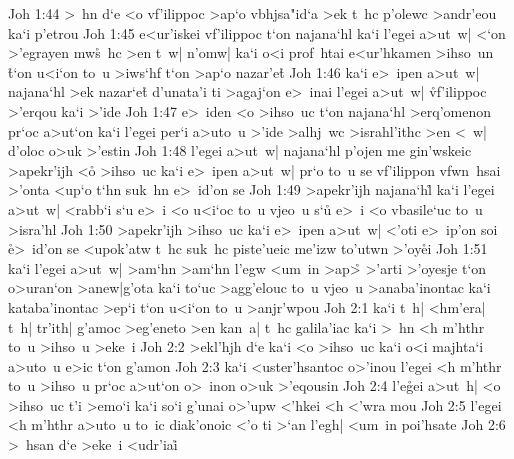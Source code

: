 \vs Joh 1:44
>~hn
d`e
<o
vf'ilippoc
>ap`o
vbhjsa"id`a
>ek
t~hc
p'olewc
>andr'eou
ka`i
p'etrou\bibvsend
\vs Joh 1:45
e<ur'iskei
vf'ilippoc
t`on
najana`hl
ka`i
l'egei
a>ut~w|
<`on
>'egrayen
mw\r{s}~hc
>en
t~w|
n'omw|
ka`i
o<i
prof~htai
e<ur'hkamen
>ihso~un
\r{t}`on
u<i`on
to~u
>iws`hf
t`on
>ap`o
nazar'e\r{t}\bibvsend
{}
\vs Joh 1:46
ka`i
e>~ipen
a>ut~w|
najana`hl
>ek
nazar`e\r{t}
d'unata'i
ti
>agaj`on
e>~inai
l'egei
a>ut~w|
\r{vf}'ilippoc
>'erqou
ka`i
>'ide\bibvsend
\vs Joh 1:47
e>~iden
<o
>ihso~uc
t`on
najana`hl
>erq'omenon
pr`oc
a>ut`on
ka`i
l'egei
per`i
a>uto~u
>'ide
>alhj~wc
>israhl'ithc
>en
<~w|
d'oloc
o>uk
>'estin\bibvsend
\vs Joh 1:48
l'egei
a>ut~w|
najana`hl
p'ojen
me
gin'wskeic
>apekr'ijh
<o\r{}
>ihso~uc
ka`i
e>~ipen
a>ut~w|
pr`o
to~u
se
vf'ilippon
vfwn~hsai
>'onta
<up`o
t`hn
suk~hn
e>~id'on
se\bibvsend
\vs Joh 1:49
>apekr'ijh
najana`hl\r{}
ka`i
l'egei
a>ut~w|
<rabb`i
s`u
e>~i
<o
u<i`oc
to~u
vjeo~u
s`u\r{}
e>~i
<o
vbasile`uc
to~u
>isra'hl\bibvsend
\vs Joh 1:50
>apekr'ijh
>ihso~uc
ka`i
e>~ipen
a>ut~w|
<'oti
e>~ip'on
soi
\r{e}>~id'on
se
<upok'atw
t~hc
suk~hc
piste'ueic
me'izw
to'utwn
>'oy\r{e}i\bibvsend
{}
\vs Joh 1:51
ka`i
l'egei
a>ut~w|
>am`hn
>am`hn
l'egw
<um~in
>ap>\r{}
>'arti
>'oyesje
t`on
o>uran`on
>anew|g'ota
ka`i
to`uc
>agg'elouc
to~u
vjeo~u
>anaba'inontac
ka`i
kataba'inontac
>ep`i
t`on
u<i`on
to~u
>anjr'wpou\bibvsend
\vs Joh 2:1
ka`i
t~h|
<hm'era|
t~h|
tr'ith|
g'amoc
>eg'eneto
>en
kan~a|
t~hc
galila'iac
ka`i
>~hn
<h
m'hthr
to~u
>ihso~u
>eke~i\bibvsend
\vs Joh 2:2
>ekl'hjh
d`e
ka`i
<o
>ihso~uc
ka`i
o<i
majhta`i
a>uto~u
e>ic
t`on
g'amon\bibvsend
\vs Joh 2:3
ka`i
<uster'hsantoc
o>'inou
l'egei
<h
m'hthr
to~u
>ihso~u
pr`oc
a>ut`on
o>~inon
o>uk
>'eqousin\bibvsend
\vs Joh 2:4
l'e\r{g}ei
a>ut~h|
<o
>ihso~uc
t'i
>emo`i
ka`i
so`i
g'unai
o>'upw
<'hkei
<h
<'wra
mou\bibvsend
\vs Joh 2:5
l'egei
<h
m'hthr
a>uto~u
to~ic
diak'onoic
<'o
ti
>`an
l'egh|
<um~in
poi'hsate\bibvsend
\vs Joh 2:6
>~hsan
d`e
>eke~i
<udr'iai\r{}
